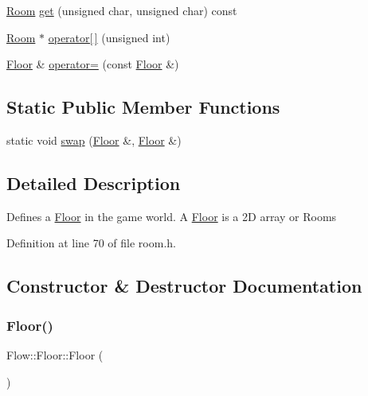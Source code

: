 \begin{DoxyCompactItemize}
\item 
\hyperlink{class_flow_1_1_room}{Room} \hyperlink{class_flow_1_1_floor_a167e37ebab4947cdc191890647ff99e6}{get} (unsigned char, unsigned char) const
\item 
\hyperlink{class_flow_1_1_room}{Room} $\ast$ \hyperlink{class_flow_1_1_floor_a4b76afdb21d1687bd9ed0d37e09a15d7}{operator\mbox{[}$\,$\mbox{]}} (unsigned int)
\item 
\hyperlink{class_flow_1_1_floor}{Floor} \& \hyperlink{class_flow_1_1_floor_a0d053f735a848823fcb7e2f8650090da}{operator=} (const \hyperlink{class_flow_1_1_floor}{Floor} \&)
\end{DoxyCompactItemize}
\subsection*{Static Public Member Functions}
\begin{DoxyCompactItemize}
\item 
static void \hyperlink{class_flow_1_1_floor_a390f2a8e15aa8c4cb50180feda028d5d}{swap} (\hyperlink{class_flow_1_1_floor}{Floor} \&, \hyperlink{class_flow_1_1_floor}{Floor} \&)
\end{DoxyCompactItemize}


\subsection{Detailed Description}
Defines a \hyperlink{class_flow_1_1_floor}{Floor} in the game world. A \hyperlink{class_flow_1_1_floor}{Floor} is a 2D array or Rooms 

Definition at line 70 of file room.\+h.



\subsection{Constructor \& Destructor Documentation}
\hypertarget{class_flow_1_1_floor_a056779b11b4084e15cc7c376f791a8f3}{}\label{class_flow_1_1_floor_a056779b11b4084e15cc7c376f791a8f3} 
\subsubsection{\texorpdfstring{Floor()}{Floor()}\hspace{0.1cm}{\footnotesize\ttfamily [1/3]}}
{\footnotesize\ttfamily Flow\+::\+Floor\+::\+Floor (\begin{DoxyParamCaption}{ }\end{DoxyParamCaption})}

